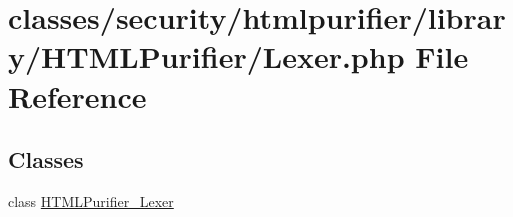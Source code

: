 \hypertarget{Lexer_8php}{\section{classes/security/htmlpurifier/library/\+H\+T\+M\+L\+Purifier/\+Lexer.php File Reference}
\label{Lexer_8php}
}
\subsection*{Classes}
\begin{DoxyCompactItemize}
\item 
class \hyperlink{classHTMLPurifier__Lexer}{H\+T\+M\+L\+Purifier\+\_\+\+Lexer}
\end{DoxyCompactItemize}
